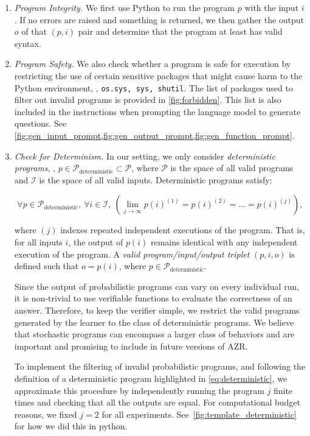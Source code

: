 \documentclass{article}
\begin{document}
\begin{enumerate}[leftmargin=*]
    \item \emph{Program Integrity.}
We first use Python to run the program \(p\) with the input \(i\). If no errors are raised and something is returned, we then gather the output \(o\) of that \((p, i)\) pair and determine that the program at least has valid syntax.
    \item \emph{Program Safety.}
We also check whether a program is safe for execution by restricting the use of certain sensitive packages that might cause harm to the Python environment, \ie, \texttt{os.sys, sys, shutil}. The list of packages used to filter out invalid programs is provided in \cref{fig:forbidden}. This list is also included in the instructions when prompting the language model to generate questions. See \cref{fig:gen_input_prompt,fig:gen_output_prompt,fig:gen_function_prompt}.
  \item \emph{Check for Determinism.} In our setting, we only consider \emph{deterministic programs}, \ie, \(p \in \mathscr{P}_{\text{deterministic}} \subset \mathscr{P}\), where \(\mathscr{P}\) is the space of all valid programs and \(\mathscr{I}\) is the space of all valid inputs. Deterministic programs satisfy:

\begin{equation}
    \forall p \in \mathscr{P}_{\text{deterministic}},\ \forall i \in \mathscr{I},\ \left( \lim_{j \to \infty} p(i)^{(1)} = p(i)^{(2)} = \dots = p(i)^{(j)} \right),
    \label{eq:deterministic}
\end{equation}

where \((j)\) indexes repeated independent executions of the program. That is, for all inputs \(i\), the output of \(p(i)\) remains identical with any independent execution of the program. A \emph{valid program/input/output triplet} \((p,i,o)\) is defined such that \(o = p(i)\), where \(p \in \mathscr{P}_{\text{deterministic}}\).

Since the output of probabilistic programs can vary on every individual run, it is non-trivial to use verifiable functions to evaluate the correctness of an answer. Therefore, to keep the verifier simple, we restrict the valid programs generated by the learner to the class of deterministic programs. We believe that stochastic programs can encompass a larger class of behaviors and are important and promising to include in future versions of AZR.

To implement the filtering of invalid probabilistic programs, and following the definition of a deterministic program highlighted in \cref{eq:deterministic}, we approximate this procedure by independently running the program \(j\) finite times and checking that all the outputs are equal. For computational budget reasons, we fixed \(j = 2\) for all experiments. See~\cref{fig:template_deterministic} for how we did this in python.
\end{enumerate}
\end{document}

